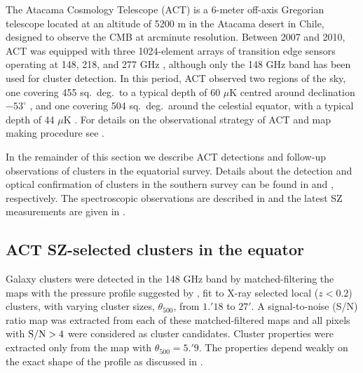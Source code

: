 The Atacama Cosmology Telescope (ACT) is a 6-meter off-axis Gregorian telescope located at an 
altitude of 5200 m in the Atacama desert in Chile, designed to observe the CMB at arcminute 
resolution. Between 2007 and 2010, ACT was equipped with three 1024-element arrays of transition 
edge sensors operating at 148, 218, and 277 GHz \citep{fowler07,swetz11}, although only the 148 
GHz band has been used for cluster detection. In this period, ACT observed two regions of the sky, 
one covering 455 sq.\ deg.\ to a typical depth of 60 $\mu$K centred around declination $-53^\circ$ 
\citep[the ``southern'' survey,][]{marriage11_sz,marriage11_sources}, and one covering 504 sq.\ deg.\ 
around the celestial equator, with a typical depth of 44 $\mu$K \citep[the ``equatorial'' 
survey,][]{hasselfield13}. For details on the observational strategy of ACT and map making 
procedure see \cite{dunner13}.

In the remainder of this section we describe ACT detections and follow-up observations of clusters 
in the equatorial survey. Details about the detection and optical confirmation of clusters in the 
southern survey can be found in \cite{marriage11_sz} and \cite{menanteau10_act}, respectively. The 
spectroscopic observations are described in \cite{sifon13} and the latest SZ measurements are 
given in \cite{hasselfield13}.

\subsection{ACT SZ-selected clusters in the equator}\label{s:szobs}

Galaxy clusters were detected in the 148 GHz band by matched-filtering the maps with the pressure 
profile suggested by \cite{arnaud10}, fit to X-ray selected local ($z<0.2$) clusters, with varying 
cluster sizes, $\theta_{500}$, from $1.\!'18$ to $27'$. A signal-to-noise (S/N) ratio 
map was extracted from each of these matched-filtered maps and all pixels with ${\rm S/N}>4$ were 
considered as cluster candidates. Cluster properties were extracted only from the map with 
$\theta_{500}=5.\!'9$. The properties depend weakly on the exact shape of the profile as 
discussed in \cite{hasselfield13}.

